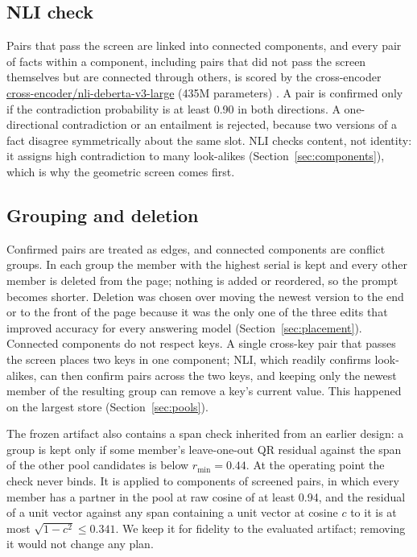 \documentclass[11pt]{article}
\begin{document}
\subsection{NLI check}
\label{sec:nli}

Pairs that pass the screen are linked into connected components, and every pair of facts within a component, including pairs that did not pass the screen themselves but are connected through others, is scored by the cross-encoder \url{cross-encoder/nli-deberta-v3-large} (435M parameters) \cite{he2023debertav3}. A pair is confirmed only if the contradiction probability is at least 0.90 in both directions. A one-directional contradiction or an entailment is rejected, because two versions of a fact disagree symmetrically about the same slot. NLI checks content, not identity: it assigns high contradiction to many look-alikes (Section~\ref{sec:components}), which is why the geometric screen comes first.

\subsection{Grouping and deletion}
\label{sec:group}

Confirmed pairs are treated as edges, and connected components are conflict groups. In each group the member with the highest serial is kept and every other member is deleted from the page; nothing is added or reordered, so the prompt becomes shorter. Deletion was chosen over moving the newest version to the end or to the front of the page because it was the only one of the three edits that improved accuracy for every answering model (Section~\ref{sec:placement}). Connected components do not respect keys. A single cross-key pair that passes the screen places two keys in one component; NLI, which readily confirms look-alikes, can then confirm pairs across the two keys, and keeping only the newest member of the resulting group can remove a key's current value. This happened on the largest store (Section~\ref{sec:pools}).

The frozen artifact also contains a span check inherited from an earlier design: a group is kept only if some member's leave-one-out QR residual against the span of the other pool candidates is below $r_{\min}=0.44$. At the operating point the check never binds. It is applied to components of screened pairs, in which every member has a partner in the pool at raw cosine of at least 0.94, and the residual of a unit vector against any span containing a unit vector at cosine $c$ to it is at most $\sqrt{1-c^{2}}\le0.341$. We keep it for fidelity to the evaluated artifact; removing it would not change any plan.
\end{document}
